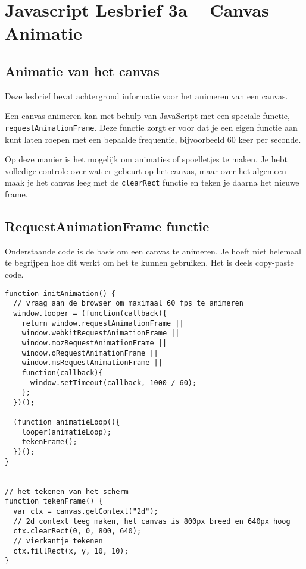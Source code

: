\documentclass[a4paper]{report}
\begin{document}
\chapter*{\textcolor{seccol}{Javascript} Lesbrief 3a -- Canvas Animatie}

\section*{Animatie van het canvas}
Deze lesbrief bevat achtergrond informatie voor het animeren van een canvas.

Een canvas animeren kan met behulp van JavaScript met een speciale functie, \texttt{requestAnimationFrame}. Deze functie zorgt er voor dat je een eigen functie aan kunt laten roepen met een bepaalde frequentie, bijvoorbeeld 60 keer per seconde.

Op deze manier is het mogelijk om animaties of spoelletjes te maken. Je hebt volledige controle over wat er gebeurt op het canvas, maar over het algemeen maak je het canvas leeg met de \texttt{clearRect} functie en teken je daarna het nieuwe frame.

\section*{RequestAnimationFrame functie}
Onderstaande code is de basis om een canvas te animeren. Je hoeft niet helemaal te begrijpen hoe dit werkt om het te kunnen gebruiken. Het is deels copy-paste code.

\begin{lstlisting}
function initAnimation() {
  // vraag aan de browser om maximaal 60 fps te animeren
  window.looper = (function(callback){
    return window.requestAnimationFrame ||
    window.webkitRequestAnimationFrame ||
    window.mozRequestAnimationFrame ||
    window.oRequestAnimationFrame ||
    window.msRequestAnimationFrame ||
    function(callback){ 
      window.setTimeout(callback, 1000 / 60);
    };
  })();
  
  (function animatieLoop(){
    looper(animatieLoop); 
    tekenFrame();
  })();
}


// het tekenen van het scherm
function tekenFrame() {
  var ctx = canvas.getContext("2d");
  // 2d context leeg maken, het canvas is 800px breed en 640px hoog
  ctx.clearRect(0, 0, 800, 640);
  // vierkantje tekenen
  ctx.fillRect(x, y, 10, 10);
}
\end{lstlisting}
\end{document}
